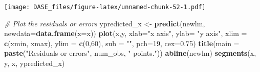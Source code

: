 \documentclass[]{book}
\newenvironment{Shaded}{\begin{snugshade}}{\end{snugshade}}
\newcommand{\KeywordTok}[1]{\textcolor[rgb]{0.13,0.29,0.53}{\textbf{{#1}}}}
\newcommand{\DataTypeTok}[1]{\textcolor[rgb]{0.13,0.29,0.53}{{#1}}}
\newcommand{\DecValTok}[1]{\textcolor[rgb]{0.00,0.00,0.81}{{#1}}}
\newcommand{\FloatTok}[1]{\textcolor[rgb]{0.00,0.00,0.81}{{#1}}}
\newcommand{\StringTok}[1]{\textcolor[rgb]{0.31,0.60,0.02}{{#1}}}
\newcommand{\CommentTok}[1]{\textcolor[rgb]{0.56,0.35,0.01}{\textit{{#1}}}}
\newcommand{\OtherTok}[1]{\textcolor[rgb]{0.56,0.35,0.01}{{#1}}}
\newcommand{\NormalTok}[1]{{#1}}
\begin{document}
\begin{Shaded}
\end{Shaded}

\texttt{[image: DASE\_files/figure-latex/unnamed-chunk-52-1.pdf]}

\begin{Shaded}
\begin{Highlighting}[]
\CommentTok{# Plot the residuals or errors}
\NormalTok{ypredicted_x <-}\StringTok{ }\KeywordTok{predict}\NormalTok{(newlm, }\DataTypeTok{newdata=}\KeywordTok{data.frame}\NormalTok{(}\DataTypeTok{x=}\NormalTok{x))}
\KeywordTok{plot}\NormalTok{(x,y, }\DataTypeTok{xlab=}\StringTok{"x axis"}\NormalTok{, }\DataTypeTok{ylab=} \StringTok{"y axis"}\NormalTok{, }\DataTypeTok{xlim =} \KeywordTok{c}\NormalTok{(xmin, xmax), }\DataTypeTok{ylim =} \KeywordTok{c}\NormalTok{(}\DecValTok{0}\NormalTok{,}\DecValTok{60}\NormalTok{), }\DataTypeTok{sub =} \StringTok{""}\NormalTok{, }\DataTypeTok{pch=}\DecValTok{19}\NormalTok{, }\DataTypeTok{cex=}\FloatTok{0.75}\NormalTok{)}
\KeywordTok{title}\NormalTok{(}\DataTypeTok{main =} \KeywordTok{paste}\NormalTok{(}\StringTok{"Residuals or errors"}\NormalTok{, num_obs, }\StringTok{" points."}\NormalTok{))}
\KeywordTok{abline}\NormalTok{(newlm)}
\KeywordTok{segments}\NormalTok{(x, y, x, ypredicted_x)}
\end{Highlighting}
\end{Shaded}
\end{document}
